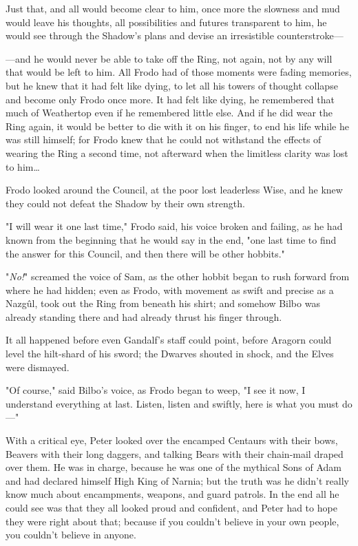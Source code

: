 Just that, and all would become clear to him, once more the slowness and mud 
would leave his thoughts, all possibilities and futures transparent to him, he 
would see through the Shadow's plans and devise an irresistible counterstroke---

---and he would never be able to take off the Ring, not again, not by any will 
that would be left to him. All Frodo had of those moments were fading memories, 
but he knew that it had felt like dying, to let all his towers of thought 
collapse and become only Frodo once more. It had felt like dying, he remembered 
that much of Weathertop even if he remembered little else. And if he did wear 
the Ring again, it would be better to die with it on his finger, to end his 
life while he was still himself; for Frodo knew that he could not withstand the 
effects of wearing the Ring a second time, not afterward when the limitless 
clarity was lost to him{\ldots}

Frodo looked around the Council, at the poor lost leaderless Wise, and he knew 
they could not defeat the Shadow by their own strength.

"I will wear it one last time," Frodo said, his voice broken and failing, as he 
had known from the beginning that he would say in the end, "one last time to 
find the answer for this Council, and then there will be other hobbits."

"\emph{No!}" screamed the voice of Sam, as the other hobbit began to rush 
forward from where he had hidden; even as Frodo, with movement as swift and 
precise as a Nazgûl, took out the Ring from beneath his shirt; and somehow 
Bilbo was already standing there and had already thrust his finger through.

It all happened before even Gandalf's staff could point, before Aragorn could 
level the hilt-shard of his sword; the Dwarves shouted in shock, and the Elves 
were dismayed.

"Of course," said Bilbo's voice, as Frodo began to weep, "I see it now, I 
understand everything at last. Listen, listen and swiftly, here is what you 
must do---"
\sbreak


\noindent{}With a critical eye, Peter looked over the encamped Centaurs with their bows, 
Beavers with their long daggers, and talking Bears with their chain-mail draped 
over them. He was in charge, because he was one of the mythical Sons of Adam 
and had declared himself High King of Narnia; but the truth was he didn't 
really know much about encampments, weapons, and guard patrols. In the end all 
he could see was that they all looked proud and confident, and Peter had to 
hope they were right about that; because if you couldn't believe in your own 
people, you couldn't believe in anyone.

